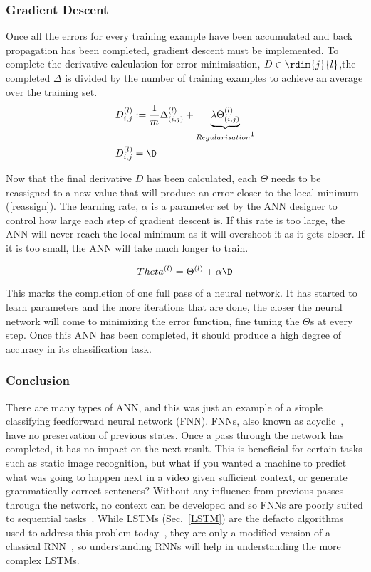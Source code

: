\subsubsection{Gradient Descent} \label{grad}
Once all the errors for every training example have been accumulated and back propagation has been completed, gradient descent must be implemented. To complete the derivative calculation for error minimisation, $D \in \rdim{j}{l}$,the completed $\Delta$ is divided by the number of training examples to achieve an average over the training set.
\begin{align*}
  D_{i,j}^{(l)} &:= \frac{1}{m}\Delta_{(i,j)}^{(l)}+\underbrace{\lambda \Theta_{(i,j)}^{(l)}}_{Regularisation\footnotemark} \\
  D_{i,j}^{(l)} &= \D
\end{align*}

\addtocounter{footnote}{-1}

Now that the final derivative $D$ has been calculated, each $\Theta$ needs to be reassigned to a new value that will produce an error closer to the local minimum (\ref{reassign}). The learning rate, $\alpha$ is a parameter set by the ANN designer to control how large each step of gradient descent is. If this rate is too large, the ANN will never reach the local minimum as it will overshoot it as it gets closer.  If it is too small, the ANN will take much longer to train.

\begin{equation} \label{reassign}
  Theta^{(l)} = \Theta^{(l)} + \alpha\D
\end{equation}

This marks the completion of one full pass of a neural network.  It has started to learn parameters and the more iterations that are done, the closer the neural network will come to minimizing the error function, fine tuning the $\Theta$s at every step. Once this ANN has been completed, it should produce a high degree of accuracy in its classification task.

\subsubsection{Conclusion}
There are many types of ANN, and this was just an example of a simple classifying feedforward neural network (FNN). FNNs, also known as acyclic~\cite{Schmidhuber2015}, have no preservation of previous states. Once a pass through the network has completed, it has no impact on the next result. This is beneficial for certain tasks such as static image recognition, but what if you wanted a machine to predict what was going to happen next in a video given sufficient context, or generate grammatically correct sentences? Without any influence from previous passes through the network, no context can be developed and so FNNs are poorly suited to sequential tasks~\cite{LeCun2015,Schmidhuber2015}. While LSTMs (Sec.~\ref{LSTM}) are the defacto algorithms used to address this problem today~\cite{Schmidhuber2015}, they are only a modified version of a classical RNN~\cite{Hochreiter1997}, so understanding RNNs will help in understanding the more complex LSTMs.

